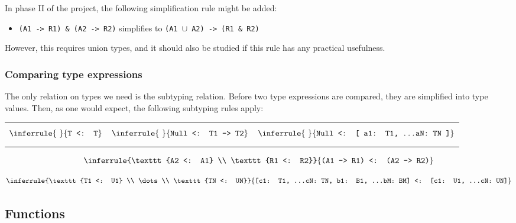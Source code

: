 \documentclass[12pt, draft]{article}
\begin{document}
In phase II of the project, the following simplification rule might be added:

\begin{itemize}
\item \texttt{(A1 -> R1) \& (A2 -> R2)} simplifies to \texttt{(A1 $\cup$ A2) -> (R1 \& R2)}
\end{itemize}

However, this requires union types, and it should also be studied if this rule has any practical usefulness.

\subsubsection{Comparing type expressions}

The only relation on types we need is the subtyping relation. Before two type expressions are compared, they are simplified into type values. Then, as one would expect, the following subtyping rules apply:

\begin{center}
\begin{tabular}{ccc}
$$\inferrule{~}{\texttt{T <: T}}$$
&
$$\inferrule{~}{\texttt{Null <: T1 -> T2}}$$
&
$$\inferrule{~}{\texttt{Null <: [ a1: T1, \dots aN: TN ]}}$$
\end{tabular}
\end{center}

$$\inferrule{\texttt{A2 <: A1} \\ \texttt{R1 <: R2}}
            {\texttt{(A1 -> R1) <: (A2 -> R2)}}$$

$$\inferrule{\texttt{T1 <: U1} \\ \dots \\ \texttt{TN <: UN}}
            {\texttt{[c1: T1, \dots cN: TN, b1: B1, \dots bM: BM] <: [c1: U1, \dots cN: UN]}}$$




\subsection{Functions}
\end{document}
